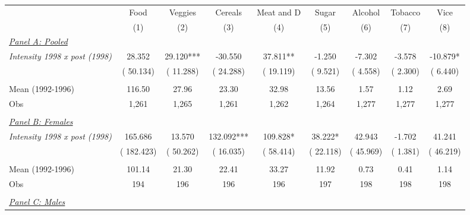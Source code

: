 \begin{tabular}{lcccccccc} \hline \hline
& \multicolumn{1}{c}{Food} & \multicolumn{1}{c}{Veggies} & \multicolumn{1}{c}{Cereals} & \multicolumn{1}{c}{Meat and D} & \multicolumn{1}{c}{Sugar} & \multicolumn{1}{c}{Alcohol} & \multicolumn{1}{c}{Tobacco} & \multicolumn{1}{c}{Vice}  \\ 
\cmidrule(lr){2-2}\cmidrule(lr){3-3}\cmidrule(lr){4-4} \cmidrule(lr){5-5}\cmidrule(lr){6-6}\cmidrule(lr){7-7}\cmidrule(lr){8-8} \cmidrule(lr){9-9}
& (1) & (2) & (3) & (4) & (5) & (6) & (7) & (8) \\  \toprule
\underline{\textit{Panel A: Pooled}}  \\  
\textit{Intensity 1998 x post (1998)} &       28.352  &       29.120*** &      -30.550 &       37.811** &       -1.250  &       -7.302 &       -3.578 &      -10.879*\\  
& (      50.134)  & (      11.288) & (      24.288) & (      19.119) & (       9.521)  & (       4.558) & (       2.300) & (       6.440)\\ 
 &  & &  &  &  &  &  & \\ 
Mean (1992-1996) &       116.50  &        27.96 &        23.30 &        32.98 &        13.56  &         1.57 &         1.12  &         2.69  \\  
Obs &        1,261  &        1,265 &        1,261 &        1,262 &        1,264  &        1,277 &        1,277  &        1,277 \\ 
 &  & &  &  &  &  &  & \\ 
\underline{\textit{Panel B: Females}}  \\  
\textit{Intensity 1998 x post (1998)} &      165.686  &       13.570 &      132.092*** &      109.828* &       38.222*  &       42.943 &       -1.702 &       41.241\\  
& (     182.423)  & (      50.262) & (      16.035) & (      58.414) & (      22.118)  & (      45.969) & (       1.381) & (      46.219)\\ 
 &  & &  &  &  &  &  & \\ 
Mean (1992-1996) &       101.14  &        21.30 &        22.41 &        33.27 &        11.92  &         0.73 &         0.41  &         1.14  \\  
Obs &          194  &          196 &          196 &          196 &          197  &          198 &          198  &          198 \\ 
 &  & &  &  &  &  &  & \\ 
\underline{\textit{Panel C: Males}}  \\  

\end{tabular}
